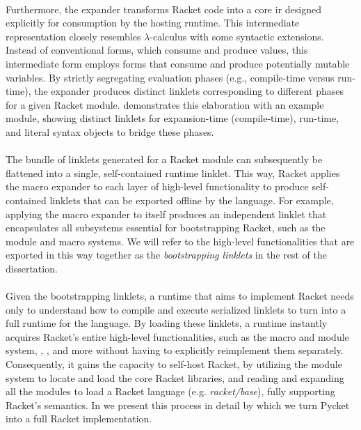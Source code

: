 
		\paragraph{}%
			Furthermore, the expander transforms Racket code into a core \gls{ir} designed explicitly for consumption by the hosting runtime. This intermediate representation closely resembles $\lambda$-calculus with some syntactic extensions. Instead of conventional  forms, which consume and produce values, this intermediate form employs  forms that consume and produce potentially mutable variables. By strictly segregating evaluation phases (e.g., compile-time versus run-time), the expander produces distinct linklets corresponding to different phases for a given Racket module.  demonstrates this elaboration with an example module, showing distinct linklets for expansion-time (compile-time), run-time, and literal syntax objects to bridge these phases.

		\paragraph{}%
			The bundle of linklets generated for a Racket module can subsequently be flattened into a single, self-contained runtime linklet. This way, Racket applies the macro expander to each layer of high-level functionality to produce self-contained linklets that can be exported offline by the language. For example, applying the macro expander to itself produces an independent linklet that encapsulates all subsystems essential for bootstrapping Racket, such as the module and macro systems. We will refer to the high-level functionalities that are exported in this way together as the \emph{bootstrapping linklets} in the rest of the dissertation.

		\paragraph{}%
			Given the bootstrapping linklets, a runtime that aims to implement Racket needs only to understand how to compile and execute serialized linklets to turn into a full runtime for the language. By loading these linklets, a runtime instantly acquires Racket's entire high-level functionalities, such as the macro and module system, , , and more without having to explicitly reimplement them separately. Consequently, it gains the capacity to self-host Racket, by utilizing the module system to locate and load the core Racket libraries, and reading and expanding all the modules to load a Racket language (e.g. \emph{racket/base}), fully supporting Racket’s semantics. In  we present this process in detail by which we turn Pycket into a full Racket implementation.

